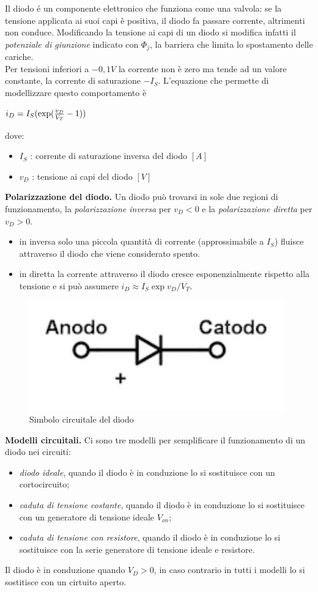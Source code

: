 \documentclass[a4paper,portrait,12pt]{article}
\theoremstyle{definition}
\begin{document}
Il diodo é un componente elettronico che funziona come una valvola: se la tensione applicata ai suoi capi 
è positiva, il diodo fa passare corrente, altrimenti non conduce. Modificando la tensione ai capi di un
diodo si modifica infatti il \textit{potenziale di giunzione} indicato con $\Phi_j$, la barriera che
limita lo spostamento delle cariche.\\
Per tensioni inferiori a $-0,1 V$ la corrente non è zero ma tende ad un valore constante, la corrente di
saturazione $-I_S$. L'equazione che permette di modellizzare questo comportamento è
\begin{center}
$i_D = I_S (\exp({v_D \over V_T} - 1))$
\end{center}
dove:
\begin{itemize}
\item $I_S$ : corrente di saturazione inversa del diodo $[A]$
\item $v_D$ : tensione ai capi del diodo $[V]$
\end{itemize}
\bigskip

\textbf{Polarizzazione del diodo.} Un diodo può trovarsi in sole due regioni di funzionamento, la \textit{
polarizzazione inversa} per $v_D < 0$ e la \textit{polarizzazione diretta} per $v_D > 0$.
\begin{itemize}
\item in inversa solo una piccola quantità di corrente (approssimabile a $I_S$) fluisce attraverso il diodo
	che viene considerato spento.
\item in diretta la corrente attraverso il diodo cresce esponenzialmente rispetto alla tensione e si può
	assumere $i_D \approx I_S \exp{v_D / V_T}$.
\end{itemize}

\begin{figure}[H]
\centering
\includegraphics[width=.3\linewidth]{img/diodo.pdf}
\caption{Simbolo circuitale del diodo}
\label{fig:diodo}
\end{figure}

\textbf{Modelli circuitali.} Ci sono tre modelli per semplificare il funzionamento di un diodo nei circuiti:
\begin{itemize}
\item \textit{diodo ideale}, quando il diodo è in conduzione lo si sostituisce con un cortocircuito;
\item \textit{caduta di tensione costante}, quando il diodo è in conduzione lo si sostituisce con un 
	generatore di tensione ideale $V_{on}$;
\item \textit{caduta di tensione con resistore}, quando il diodo è in conduzione lo si sostituisce con la
	serie generatore di tensione ideale e resistore.
\end{itemize}
Il diodo è in conduzione quando $V_D > 0$, in caso contrario in tutti i modelli lo si sostitisce con un 
cirtuito aperto.
\bigskip
\end{document}
